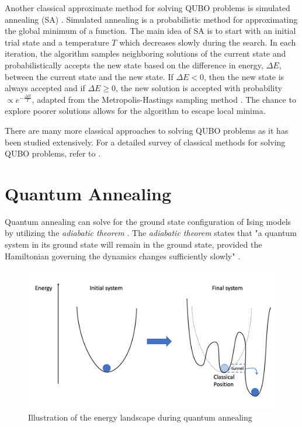 Another classical approximate method for solving QUBO problems is simulated annealing (SA) \cite{KATAYAMA2001103}. Simulated annealing \cite{Kirkpatrick} is a probabilistic method for approximating the global minimum of a function. The main idea of SA is to start with an initial trial state and a temperature $T$ which decreases slowly during the search. In each iteration, the algorithm samples neighboring solutions of the current state and probabilistically accepts the new state based on the difference in energy, $\Delta E$, between the current state and the new state. If $\Delta E < 0$, then the new state is always accepted and if $\Delta E \geq 0$, the new solution is accepted with probability $\propto e^{-\frac{\Delta E}{T}}$, adapted from the Metropolis-Hastings sampling method \cite{metropolissampling}. The chance to explore poorer solutions allows for the algorithm to escape local minima.

There are many more classical approaches to solving QUBO problems as it has been studied extensively. For a detailed survey of classical methods for solving QUBO problems, refer to \cite{punnen2022quadratic}.

\section{Quantum Annealing}\label{section:annealing}
Quantum annealing can solve for the ground state configuration of Ising models by utilizing the \textit{adiabatic theorem} \cite{b14}. The \textit{adiabatic theorem} states that "a quantum system in its ground state will remain in the ground state, provided the Hamiltonian governing the dynamics changes sufficiently slowly" \cite{b14,b15}.

\begin{figure}[h!]
    \centering
    \includegraphics[width=0.8\linewidth]{images/quantum_annealing.png}
    \caption{Illustration of the energy landscape during quantum annealing}
    \label{quantumannealing}
\end{figure}

